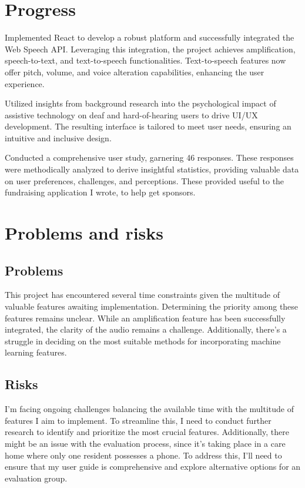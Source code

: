 \documentclass[11pt]{article}
\begin{document}
\section{Progress}\label{progress}

Implemented React to develop a robust platform and successfully integrated the Web Speech API. Leveraging this integration, the project achieves amplification, speech-to-text, and text-to-speech functionalities. Text-to-speech features now offer pitch, volume, and voice alteration capabilities, enhancing the user experience.

Utilized insights from background research into the psychological impact of assistive technology on deaf and hard-of-hearing users to drive UI/UX development. The resulting interface is tailored to meet user needs, ensuring an intuitive and inclusive design.

Conducted a comprehensive user study, garnering 46 responses. These responses were methodically analyzed to derive insightful statistics, providing valuable data on user preferences, challenges, and perceptions. These provided useful to the fundraising application I wrote, to help get sponsors.

\section{Problems and risks}\label{problems-and-risks}

\subsection{Problems}\label{problems}

This project has encountered several time constraints given the multitude of valuable features awaiting implementation. Determining the priority among these features remains unclear. While an amplification feature has been successfully integrated, the clarity of the audio remains a challenge. Additionally, there's a struggle in deciding on the most suitable methods for incorporating machine learning features.

\subsection{Risks}\label{risks}

I'm facing ongoing challenges balancing the available time with the multitude of features I aim to implement. To streamline this, I need to conduct further research to identify and prioritize the most crucial features. Additionally, there might be an issue with the evaluation process, since it's taking place in a care home where only one resident possesses a phone. To address this, I'll need to ensure that my user guide is comprehensive and explore alternative options for an evaluation group.
    
\end{document}
